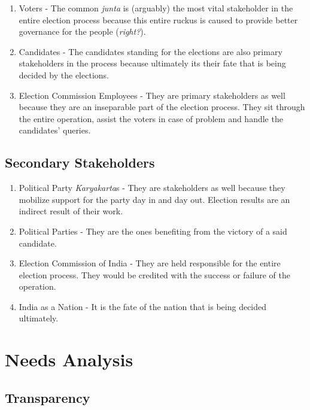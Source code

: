 \documentclass{article}
\begin{document}
\begin{enumerate}  
\item Voters - The common \emph{junta} is (arguably) the most vital stakeholder in the entire election process because this entire ruckus is caused to provide better governance for the people (\emph{right?}).
\item Candidates - The candidates standing for the elections are also primary stakeholders in the process because ultimately its their fate that is being decided by the elections.
\item Election Commission Employees - They are primary stakeholders as well because they are an inseparable part of the election process. They sit through the entire operation, assist the voters in case of problem and handle the candidates' queries. 
\end{enumerate}

\subsection{Secondary Stakeholders}

\begin{enumerate}  
\item Political Party \emph{Karyakarta}s - They are stakeholders as well because they mobilize support for the party day in and day out. Election results are an indirect result of their work.
\item Political Parties - They are the ones benefiting from the victory of a said candidate.
\item Election Commission of India - They are held responsible for the entire election process. They would be credited with the success or failure of the operation.
\item India as a Nation - It is the fate of the nation that is being decided ultimately.
\end{enumerate}

\section{Needs Analysis}

\subsection{Transparency}
\end{document}
